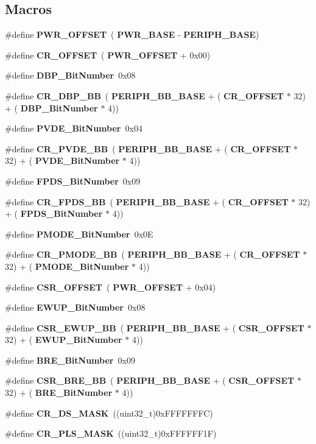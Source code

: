 \subsection*{Macros}
\begin{DoxyCompactItemize}
\item 
\#define \textbf{ P\+W\+R\+\_\+\+O\+F\+F\+S\+ET}~(\textbf{ P\+W\+R\+\_\+\+B\+A\+SE} -\/ \textbf{ P\+E\+R\+I\+P\+H\+\_\+\+B\+A\+SE})
\item 
\#define \textbf{ C\+R\+\_\+\+O\+F\+F\+S\+ET}~(\textbf{ P\+W\+R\+\_\+\+O\+F\+F\+S\+ET} + 0x00)
\item 
\#define \textbf{ D\+B\+P\+\_\+\+Bit\+Number}~0x08
\item 
\#define \textbf{ C\+R\+\_\+\+D\+B\+P\+\_\+\+BB}~(\textbf{ P\+E\+R\+I\+P\+H\+\_\+\+B\+B\+\_\+\+B\+A\+SE} + (\textbf{ C\+R\+\_\+\+O\+F\+F\+S\+ET} $\ast$ 32) + (\textbf{ D\+B\+P\+\_\+\+Bit\+Number} $\ast$ 4))
\item 
\#define \textbf{ P\+V\+D\+E\+\_\+\+Bit\+Number}~0x04
\item 
\#define \textbf{ C\+R\+\_\+\+P\+V\+D\+E\+\_\+\+BB}~(\textbf{ P\+E\+R\+I\+P\+H\+\_\+\+B\+B\+\_\+\+B\+A\+SE} + (\textbf{ C\+R\+\_\+\+O\+F\+F\+S\+ET} $\ast$ 32) + (\textbf{ P\+V\+D\+E\+\_\+\+Bit\+Number} $\ast$ 4))
\item 
\#define \textbf{ F\+P\+D\+S\+\_\+\+Bit\+Number}~0x09
\item 
\#define \textbf{ C\+R\+\_\+\+F\+P\+D\+S\+\_\+\+BB}~(\textbf{ P\+E\+R\+I\+P\+H\+\_\+\+B\+B\+\_\+\+B\+A\+SE} + (\textbf{ C\+R\+\_\+\+O\+F\+F\+S\+ET} $\ast$ 32) + (\textbf{ F\+P\+D\+S\+\_\+\+Bit\+Number} $\ast$ 4))
\item 
\#define \textbf{ P\+M\+O\+D\+E\+\_\+\+Bit\+Number}~0x0E
\item 
\#define \textbf{ C\+R\+\_\+\+P\+M\+O\+D\+E\+\_\+\+BB}~(\textbf{ P\+E\+R\+I\+P\+H\+\_\+\+B\+B\+\_\+\+B\+A\+SE} + (\textbf{ C\+R\+\_\+\+O\+F\+F\+S\+ET} $\ast$ 32) + (\textbf{ P\+M\+O\+D\+E\+\_\+\+Bit\+Number} $\ast$ 4))
\item 
\#define \textbf{ C\+S\+R\+\_\+\+O\+F\+F\+S\+ET}~(\textbf{ P\+W\+R\+\_\+\+O\+F\+F\+S\+ET} + 0x04)
\item 
\#define \textbf{ E\+W\+U\+P\+\_\+\+Bit\+Number}~0x08
\item 
\#define \textbf{ C\+S\+R\+\_\+\+E\+W\+U\+P\+\_\+\+BB}~(\textbf{ P\+E\+R\+I\+P\+H\+\_\+\+B\+B\+\_\+\+B\+A\+SE} + (\textbf{ C\+S\+R\+\_\+\+O\+F\+F\+S\+ET} $\ast$ 32) + (\textbf{ E\+W\+U\+P\+\_\+\+Bit\+Number} $\ast$ 4))
\item 
\#define \textbf{ B\+R\+E\+\_\+\+Bit\+Number}~0x09
\item 
\#define \textbf{ C\+S\+R\+\_\+\+B\+R\+E\+\_\+\+BB}~(\textbf{ P\+E\+R\+I\+P\+H\+\_\+\+B\+B\+\_\+\+B\+A\+SE} + (\textbf{ C\+S\+R\+\_\+\+O\+F\+F\+S\+ET} $\ast$ 32) + (\textbf{ B\+R\+E\+\_\+\+Bit\+Number} $\ast$ 4))
\item 
\#define \textbf{ C\+R\+\_\+\+D\+S\+\_\+\+M\+A\+SK}~((uint32\+\_\+t)0x\+F\+F\+F\+F\+F\+F\+F\+C)
\item 
\#define \textbf{ C\+R\+\_\+\+P\+L\+S\+\_\+\+M\+A\+SK}~((uint32\+\_\+t)0x\+F\+F\+F\+F\+F\+F1\+F)
\end{DoxyCompactItemize}
